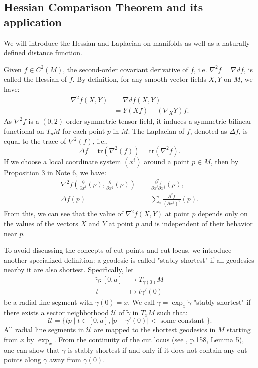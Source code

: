 \documentclass{ctexart}
\begin{document}
\subsection*{Hessian Comparison Theorem and its application}
We will introduce the Hessian and Laplacian on manifolds as well as a naturally defined distance function.

Given $f\in C^2(M)$, the second-order covariant derivative of $f$, i.e. $\nabla^2 f = \nabla df$, is called the Hessian of $f$. 
By definition, for any smooth vector fields $X, Y$ on $M$, we have:
$$
\begin{aligned}
\nabla^2 f(X, Y) &= \nabla df(X, Y) \\
&= Y(Xf) - (\nabla_X Y)f.
\end{aligned}
$$
As $\nabla^2 f$ is a $(0,2)$-order symmetric tensor field, 
it induces a symmetric bilinear functional on $T_p M$ for each point $p$ in $M$.
The Laplacian of $f$, denoted as $\Delta f$, is equal to the trace of $\nabla^2(f)$, i.e.,
$$
\Delta f = \text{tr}(\nabla^2(f)) = \text{tr}(\nabla^2 f).
$$
If we choose a local coordinate system $(x^i)$ around a point $p \in M$, then by Proposition 3 in Note 6, we have:
$$
\begin{aligned}
\nabla^2 f\left(\frac{\partial}{\partial x^i}(p), \frac{\partial}{\partial x^j}(p)\right) &= \frac{\partial^2 f}{\partial x^i \partial x^j}(p), \\
\Delta f(p) &= \sum_i \frac{\partial^2 f}{\left(\partial x^i\right)^2}(p).
\end{aligned}
$$
From this, we can see that the value of $\nabla^2 f(X, Y)$ at point $p$ depends only on the values of the vectors $X$ and $Y$ at point $p$ and is independent of their behavior near $p$.

To avoid discussing the concepts of cut points and cut locus, we introduce another specialized definition: a geodesic is called "stably shortest" if all geodesics nearby it are also shortest. Specifically, let
$$
\begin{aligned}
  \widetilde{\gamma}:[0, a] &\rightarrow T_{\gamma(0)} M \\
  t &\mapsto t \gamma'(0)
\end{aligned}
$$
be a radial line segment with $\gamma(0)=x$. We call $\gamma=\exp _x \widetilde{\gamma}$ "stably shortest" if there exists a sector neighborhood $\mathcal{U}$ of $\widetilde{\gamma}$ in $T_x M$ such that:
$$
\mathcal{U}=\{t p\mid t \in[0, a],|p-\gamma'(0)|<\text { some constant }\}.
$$
All radial line segments in $\mathcal{U}$ are mapped to the shortest geodesics in $M$ starting from $x$ by $\exp _x$. 
From the continuity of the cut locus (see \cite{WuHongXi2014}, p.158, Lemma 5), one can show that 
$\gamma$ is stably shortest if and only if it does not contain any cut points along $\gamma$ away from $\gamma(0)$.
\end{document}
